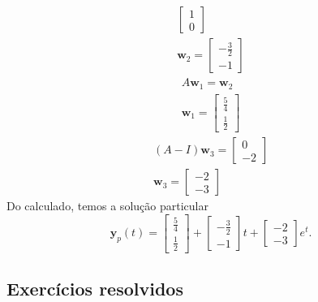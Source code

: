 \begin{ex}
\begin{gather}
\begin{bmatrix}
    1 \\
    0
  \end{bmatrix} \\
  \pmb{w}_2 =
  \begin{bmatrix}
    -\frac{3}{2} \\
    -1
  \end{bmatrix}
\end{gather}
\begin{gather}
  A\pmb{w}_1 = \pmb{w}_2 \\
  \pmb{w}_1 =
  \begin{bmatrix}
    \frac{5}{4} \\
    \frac{1}{2}
  \end{bmatrix}
\end{gather}
\begin{gather}
  (A-I)\pmb{w}_3 =
  \begin{bmatrix}
    0 \\
    -2
  \end{bmatrix} \\
  \pmb{w}_3 =
  \begin{bmatrix}
    -2 \\
    -3
  \end{bmatrix}
\end{gather}
Do calculado, temos a solução particular
\begin{equation}
  \pmb{y}_p(t) =   \begin{bmatrix}
    \frac{5}{4} \\
    \frac{1}{2}
  \end{bmatrix} +   \begin{bmatrix}
    -\frac{3}{2} \\
    -1
  \end{bmatrix}t +   \begin{bmatrix}
    -2 \\
    -3
  \end{bmatrix}e^t.
\end{equation}
\end{ex}

\subsection*{Exercícios resolvidos}


